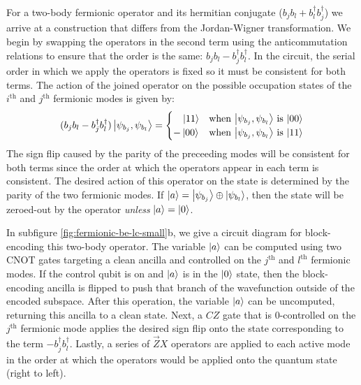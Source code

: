 For a two-body fermionic operator and its hermitian conjugate ($b_j b_l + b_l^\dagger b_j^\dagger$) we arrive at a construction that differs from the Jordan-Wigner transformation.
We begin by swapping the operators in the second term using the anticommutation relations to ensure that the order is the same: $b_j b_l - b_j^\dagger b_l^\dagger$.
In the circuit, the serial order in which we apply the operators is fixed so it must be consistent for both terms.
The action of the joined operator on the possible occupation states of the $i^\text{th}$ and $j^\text{th}$ fermionic modes is given by:
\begin{equation}
    \begin{split}
        (b_j b_l - b_j^\dagger b_l^\dagger) \ket{\psi_{b_j}, \psi_{b_l}} = \begin{cases} 
            \hspace{1em}\ket{11} & \text{when $\ket{\psi_{b_j}, \psi_{b_l}}$ is $\ket{00}$} \\
            -\ket{00} & \text{when $\ket{\psi_{b_j}, \psi_{b_l}}$ is $\ket{11}$} \\
                                        \end{cases}
    \end{split}
\end{equation}
The sign flip caused by the parity of the preceeding modes will be consistent for both terms since the order at which the operators appear in each term is consistent. 
The desired action of this operator on the state is determined by the parity of the two fermionic modes.
If $\ket{a} = \ket{\psi_{b_j}} \oplus \ket{\psi_{b_l}}$, then the state will be zeroed-out by the operator \textit{unless} $\ket{a} = \ket{0}$.

In subfigure \ref{fig:fermionic-be-lc-small}b, we give a circuit diagram for block-encoding this two-body operator.
The variable $\ket{a}$ can be computed using two CNOT gates targeting a clean ancilla and controlled on the $j^\text{th}$ and $l^\text{th}$ fermionic modes.
If the control qubit is on and $\ket{a}$ is in the $\ket{0}$ state, then the block-encoding ancilla is flipped to push that branch of the wavefunction outside of the encoded subspace.
After this operation, the variable $\ket{a}$ can be uncomputed, returning this ancilla to a clean state.
Next, a $CZ$ gate that is $0$-controlled on the $j^\text{th}$ fermionic mode applies the desired sign flip onto the state corresponding to the term $- b_j^\dagger b_l^\dagger$.
Lastly, a series of $\vec{Z}X$ operators are applied to each active mode in the order at which the operators would be applied onto the quantum state (right to left).

